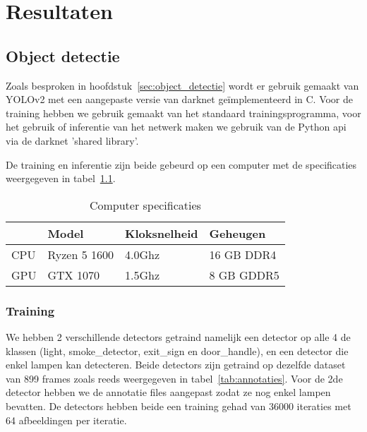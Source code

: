  
\chapter{Resultaten}\label{ch:resultaten}

\section{Object detectie}

Zoals besproken in hoofdstuk~\ref{sec:object_detectie} wordt er gebruik gemaakt van YOLOv2 met een aangepaste versie van darknet ge\"{i}mplementeerd in C.
Voor de training hebben we gebruik gemaakt van het standaard trainingsprogramma, voor het gebruik of inferentie van het netwerk maken we gebruik van
de Python api via de darknet 'shared library'.

De training en inferentie zijn beide gebeurd op een computer met de specificaties weergegeven in tabel~\ref{tab:specs}.

\begin{table}[!h]
    \caption{Computer specificaties}
    \label{tab:specs}
    \centering
    \begin{tabular}{l|l|l|l}
        & Model & Kloksnelheid & Geheugen \\
        \hline
        CPU & Ryzen 5 1600 & 4.0Ghz & 16 GB DDR4 \\
        GPU & GTX 1070 & 1.5Ghz & 8 GB GDDR5
    \end{tabular}
\end{table}

\subsection{Training}

We hebben 2 verschillende detectors getraind namelijk een detector op alle 4 de klassen (light, smoke\_detector, exit\_sign en door\_handle), en een detector
die enkel lampen kan detecteren.
Beide detectors zijn getraind op dezelfde dataset van 899 frames zoals reeds weergegeven in tabel~\ref{tab:annotaties}.
Voor de 2de detector hebben we de annotatie files aangepast zodat ze nog enkel lampen bevatten.
De detectors hebben beide een training gehad van 36000 iteraties met 64 afbeeldingen per iteratie.

